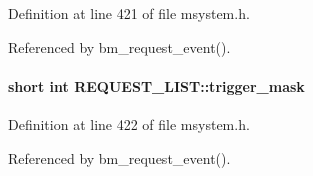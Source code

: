 Definition at line 421 of file msystem.h.

Referenced by bm\_\-request\_\-event().
\paragraph[{trigger\_\-mask}]{\setlength{\rightskip}{0pt plus 5cm}short int {\bf REQUEST\_\-LIST::trigger\_\-mask}}\hfill\label{structREQUEST__LIST_ad97d0cdcd65b8597dc10a5716169f8d5}


Definition at line 422 of file msystem.h.

Referenced by bm\_\-request\_\-event().